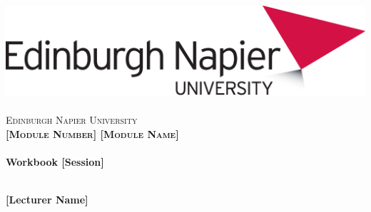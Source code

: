 \documentclass[12pt, a4paper, twoside]{book}
\begin{document}
\frontmatter

\begin{titlepage}
\vspace*{5cm}
\begin{center}
\includegraphics[width=.5\textwidth]{EdNapUniLogoCMYK}~\\[1cm]

\textsc{\Large Edinburgh Napier University}\\[1.5cm]

\textsc{\LARGE \bfseries [Module Number] [Module Name]}\\[0.5cm]

\hrulefill \\[0.4cm]
{\huge \bfseries Workbook [Session] \\[0.4cm] }
\hrulefill \\[1.5cm]

\begin{minipage}{0.4\textwidth}
\begin{center} \large
\textbf{[Lecturer Name]} \\
\end{center}
\end{minipage}

\vfill

\end{center}
\end{titlepage}

\setcounter{tocdepth}{2}

\cleardoublepage

\tableofcontents
\listoffigures


\mainmatter


\backmatter


\end{document}
